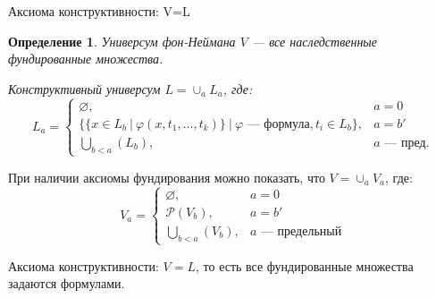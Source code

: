 \documentclass[aspectratio=169]{beamer}
\newtheorem{dfn}{Определение}[section]
\begin{document}
\begin{frame}{Аксиома конструктивности: V=L}

\begin{dfn}
\emph{Универсум фон-Неймана} $V$ --- все наследственные фундированные множества.

Конструктивный универсум $L = \cup_a L_a$, где:
$$L_a = \left\{\begin{array}{ll}
    \varnothing, & a=0\\
    \{ \{ x\in L_b\ |\ \varphi(x,t_1,\dots,t_k) \}\ |\ \varphi\text{ --- формула}, t_i \in L_b\}, & a = b'\\
    \bigcup_{b < a}(L_b), & a \text{ --- пред.}
\end{array}\right.$$
\end{dfn}


\vspace{-0.3cm}При наличии аксиомы фундирования можно показать, что $V = \cup_a V_a$, где:
$$V_a = \left\{\begin{array}{ll}
    \varnothing, & a=0\\
    \mathcal{P}(V_b), & a = b'\\
    \bigcup_{b < a}(V_b), & a \text{ --- предельный}
\end{array}\right.$$

Аксиома конструктивности: $V=L$, то есть все фундированные множества задаются формулами.


\end{frame}



%

%
%
%
\end{document}
